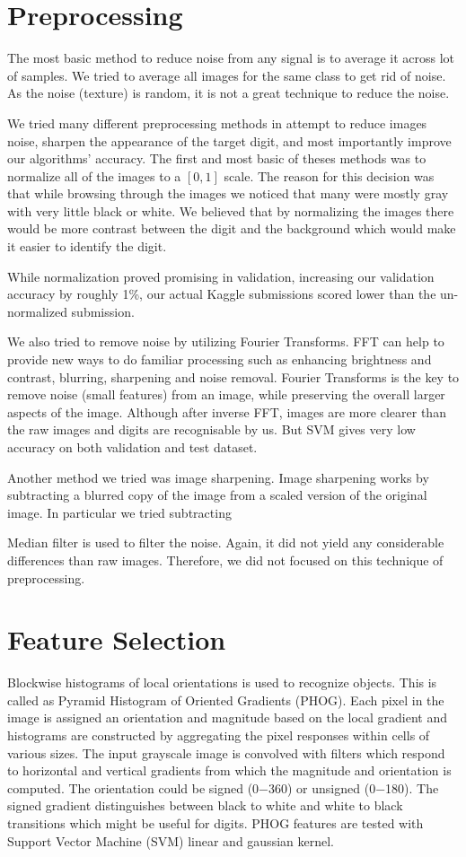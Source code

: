 \documentclass[10pt,twocolumn]{article}
\begin{document}
\section{Preprocessing}
The most basic method to reduce noise from any signal is to average it across lot of samples.  We tried to average all images for the same class to get rid of noise. As the noise (texture) is random, it is not a great technique to reduce the noise.

We tried many different preprocessing methods in attempt to reduce images noise, sharpen the appearance of the target digit, and most importantly improve our algorithms' accuracy. The first and most basic of theses methods was to normalize all of the images to a $[0,1]$ scale. The reason for this decision was that while browsing through the images we noticed that many were mostly gray with very little black or white. We believed that by normalizing the images there would be more contrast between the digit and the background which would make it easier to identify the digit.

While normalization proved promising in validation, increasing our validation accuracy by roughly 1\%, our actual Kaggle submissions scored lower than the un-normalized submission.

We also tried to remove noise by utilizing Fourier Transforms. FFT can help to provide new ways to do familiar processing such as enhancing brightness and contrast, blurring, sharpening and noise removal. Fourier Transforms is the key to remove noise (small features) from an image, while preserving the overall larger aspects of the image. Although after inverse FFT, images are more clearer than the raw images and digits are recognisable by us. But SVM gives very low accuracy on both validation and test dataset.

Another method we tried was image sharpening. Image sharpening works by subtracting a blurred copy of the image from a scaled version of the original image. In particular we tried subtracting 

Median filter is used to filter the noise. Again, it did not yield any considerable differences than raw images. Therefore, we did not focused on this technique of preprocessing.
\section{Feature Selection}
\cite {Maji09fastand} Blockwise histograms of local orientations is used to recognize objects. This is called as Pyramid Histogram of Oriented Gradients (PHOG). Each pixel in the image is assigned an orientation and magnitude based on the local gradient and histograms are constructed by aggregating the pixel responses within cells of various sizes. The input grayscale image is convolved with filters which respond to horizontal and vertical gradients from which the magnitude and orientation is computed. The orientation could be signed (0−360) or unsigned (0−180). The signed gradient distinguishes between black to white and white to black transitions which might be useful for digits. PHOG features are tested with Support Vector Machine (SVM) linear and gaussian kernel. 
\end{document}
